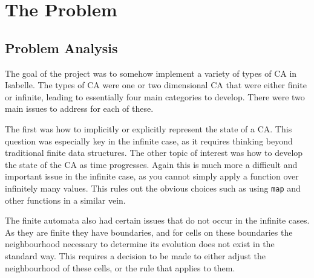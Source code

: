 \chapter{The Problem}

\section{Problem Analysis}

The goal of the project was to somehow implement a variety of types of CA in Isabelle.
The types of CA were one or two dimensional CA that were either finite or infinite,
leading to essentially four main categories to develop.
There were two main issues to address for each of these.

The first was how to implicitly or explicitly represent the state of a CA.
This question was especially key in the infinite case, 
as it requires thinking beyond traditional finite data structures.
The other topic of interest was how to develop the state of the CA as time progresses.
Again this is much more a difficult and important issue in the infinite case,
as you cannot simply apply a function over infinitely many values.
This rules out the obvious choices such as using \texttt{map} and other functions in a similar vein.

The finite automata also had certain issues that do not occur in the infinite cases.
As they are finite they have boundaries,
and for cells on these boundaries the neighbourhood necessary to determine its evolution does not exist in the standard way.
This requires a decision to be made to either adjust the neighbourhood of these cells,
or the rule that applies to them.
